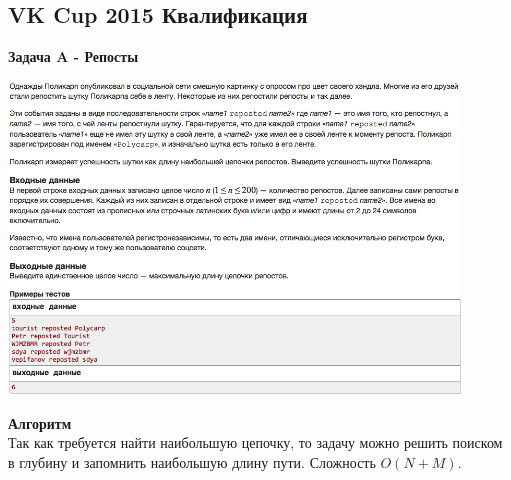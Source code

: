 \documentclass[a4paper,12pt]{article}
\begin{document}
%
%

\newpage
\subsection{VK Cup 2015 Квалификация}

\textbf{{\large Задача A - Репосты}} \\
\begin{center}
\includegraphics[width=0.9\textwidth]{VK_Qual/VK_Qual_A.png}\\ [1cm]
\end{center}
\textbf{{\large Алгоритм}} \\
Так как требуется найти наибольшую цепочку, то задачу можно решить поиском в глубину и запомнить наибольшую длину пути. Сложность $O(N+M)$.\\
\end{document}
